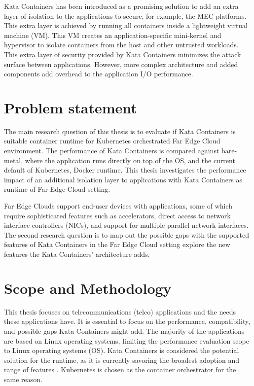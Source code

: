 Kata Containers \cite{KataContainers} has been introduced as a promising solution to add an extra layer of isolation to the applications to secure, for example, the MEC platforms. This extra layer is achieved by running all containers inside a lightweight virtual machine (VM). This VM creates an application-specific mini-kernel and hypervisor to isolate containers from the host and other untrusted workloads. This extra layer of security provided by Kata Containers minimizes the attack surface between applications. However, more complex architecture and added components add overhead to the application I/O performance.

\section{Problem statement}
\label{section:intro_problemstatement}

The main research question of this thesis is to evaluate if Kata Containers is suitable container runtime for Kubernetes orchestrated Far Edge Cloud environment. The performance of Kata Containers is compared against bare-metal, where the application runs directly on top of the OS, and the current default of Kubernetes, Docker runtime. This thesis investigates the performance impact of an additional isolation layer to applications with Kata Containers as runtime of Far Edge Cloud setting.

Far Edge Clouds support end-user devices with applications, some of which require sophisticated features such as accelerators, direct access to network interface controllers (NICs), and support for multiple parallel network interfaces. The second research question is to map out the possible gaps with the supported features of Kata Containers in the Far Edge Cloud setting explore the new features the Kata Containers' architecture adds.

\section{Scope and Methodology}
\label{section:intro_scopemethodology}

This thesis focuses on telecommunications (telco) applications and the needs these applications have. It is essential to focus on the performance, compatibility, and possible gaps Kata Containers might add. The majority of the applications are based on Linux operating systems, limiting the performance evaluation scope to Linux operating systems (OS). Kata Containers is considered the potential solution for the runtime, as it is currently savoring the broadest adoption and range of features \cite{Flauzac2020}. Kubernetes is chosen as the container orchestrator for the same reason.

